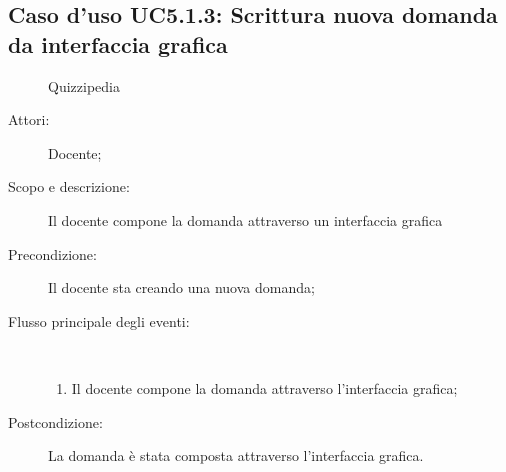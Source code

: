 \subsection{Caso d'uso UC5.1.3: Scrittura nuova domanda da interfaccia grafica}
	\begin{figure}[H]
		\centering
		\begin{resizedtikzpicture}{\textwidth}
		\begin{umlsystem}[x=0, fill=lightgray!20]{Quizzipedia}
		\end{umlsystem}
		\end{resizedtikzpicture}
		\caption{}
	\end{figure}
\begin{description}
\item[Attori:] Docente;
\item[Scopo e descrizione:] Il docente compone la domanda attraverso un interfaccia grafica
      \item[Precondizione:] Il docente sta creando una nuova domanda;

        \item[Flusso principale degli eventi:] \ 
 \begin{enumerate}
          \item Il docente compone la domanda attraverso l'interfaccia grafica;

      \end{enumerate}
    \item[Postcondizione:] La domanda è stata composta attraverso l'interfaccia grafica.
  \end{description}
\hypertarget{UC5.2}{}
